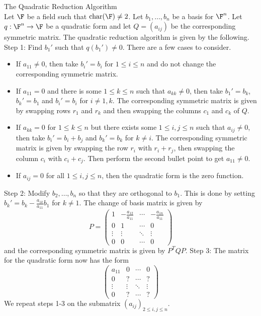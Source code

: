 \documentclass[a4paper]{article}
\begin{document}
\begin{defn}{The Quadratic Reduction Algorithm}{}\\
Let $\F$ be a field such that $\text{char}(\F)\neq 2$. Let $b_1,\dots,b_n$ be a basis for $\F^n$. Let $q:\F^n\to\F$ be a quadratic form and let $Q=(a_{ij})$ be the corresponding symmetric matrix. The quadratic reduction algorithm is given by the following. \\

Step 1: Find $b_1'$ such that $q(b_1')\neq 0$. There are a few cases to consider. 
\begin{itemize}
\item If $a_{11}\neq 0$, then take $b_i'=b_i$ for $1\leq i\leq n$ and do not change the corresponding symmetric matrix. 
\item If $a_{11}=0$ and there is some $1\leq k\leq n$ such that $a_{kk}\neq 0$, then take $b_1'=b_k$, $b_k'=b_1$ and $b_i'=b_i$ for $i\neq 1,k$. The corresponding symmetric matrix is given by swapping rows $r_1$ and $r_k$ and then swapping the columns $c_1$ and $c_k$ of $Q$. 
\item If $a_{kk}=0$ for $1\leq k\leq n$ but there exists some $1\leq i,j\leq n$ such that $a_{ij}\neq 0$, then take $b_i'=b_i+b_j$ and $b_k'=b_k$ for $k\neq i$. The corresponding symmetric matrix is given by swapping the row $r_i$ with $r_i+r_j$, then swapping the column $c_i$ with $c_i+c_j$. Then perform the second bullet point to get $a_{11}\neq 0$. 
\item If $a_{ij}=0$ for all $1\leq i,j\leq n$, then the quadratic form is the zero function. 
\end{itemize}
Step 2: Modify $b_2,\dots,b_n$ so that they are orthogonal to $b_1$. This is done by setting $b_k'=b_k-\frac{a_{1k}}{a_{11}}b_1$ for $k\neq 1$. The change of basis matrix is given by $$P=\begin{pmatrix}
1 & -\frac{a_{12}}{a_{11}} & \cdots & -\frac{a_{1n}}{a_{11}}\\
0 & 1 & \cdots & 0\\
\vdots & \vdots & \ddots & \vdots\\
0 & 0 & \cdots & 0
\end{pmatrix}$$ and the corresponding symmetric matrix is given by $P^TQP$. 
Step 3: The matrix for the quadratic form now has the form $$\begin{pmatrix}
a_{11} & 0 & \cdots & 0\\
0 & ? & \cdots & ?\\
\vdots & \vdots & \ddots & \vdots\\
0 & ? & \cdots & ?
\end{pmatrix}$$ We repeat steps 1-3 on the submatrix $(a_{ij})_{2\leq i,j\leq n}$. 
\end{defn}
\end{document}

